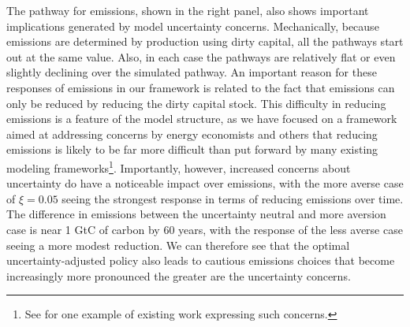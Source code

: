 \documentclass[12pt]{article}
\begin{document}
The pathway for emissions, shown in the right panel, also shows important implications generated by model uncertainty concerns. Mechanically, because emissions are determined by production using dirty capital, all the pathways start out at the same value. Also, in each case the pathways are relatively flat or even slightly declining over the simulated pathway. An important reason for these responses of emissions in our framework is related to the fact that emissions can only be reduced by reducing the dirty capital stock. This difficulty in reducing emissions is a feature of the model structure, as we have focused on a framework aimed at addressing concerns by energy economists and others that reducing emissions is likely to be far more difficult than put forward by many existing modeling frameworks\footnote{See \cite{reguant2021comment} for one example of existing work expressing such concerns.}. Importantly, however, increased concerns about uncertainty do have a noticeable impact over emissions, with the more averse case of $\xi = 0.05$ seeing the strongest response in terms of reducing emissions over time. The difference in emissions between the uncertainty neutral and more aversion case is near 1 GtC of carbon by 60 years, with the response of the less averse case seeing a more modest reduction. We can therefore see that the optimal uncertainty-adjusted policy also leads to cautious emissions choices that become increasingly more pronounced the greater are the uncertainty concerns.
\end{document}
